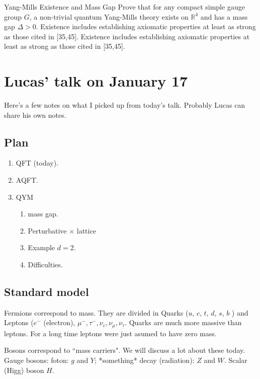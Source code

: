 \begin{thing7}{Yang-Mills Existence and Mass Gap}\leavevmode
 Prove that for any compact simple gauge group \(G\), a non-trivial quantum
 Yang-Mills theory exists on \(\mathbb{R}^4\) and has a mass gap \(\Delta>0\).
 Existence includes establishing axiomatic properties at least as strong as
 those cited in [35,45]. Existence includes establishing axiomatic properties at
 least as strong as those cited in [35,45].
\end{thing7}

\section{Lucas' talk on January 17}

Here's a few notes on what I picked up from today's talk. Probably Lucas can
share his own notes.

\subsection{Plan}

\begin{enumerate}
\item QFT (today).
\item AQFT.
 \item  QYM
\begin{enumerate}
\item mass gap.
\item Perturbative \(\times\) lattice
\item Example \(d=2\).
\item Difficulties.
\end{enumerate}
\end{enumerate}


\subsection{Standard model}

Fermions correspond to mass. They are divided in Quarks ($u$, $c$, $t$, $d$,
$s$, $b$ ) and Leptons (\(e^-\) (electron), \(\mu^-, \tau^-, \nu_e, \nu_\mu,
\nu_\tau\). Quarks are much more massive than leptons. For a long time leptons
were just asumed to have zero mass.

Bosons correspond to ``mass carriers". We will discuss a lot about these today.
Gauge bosons: foton: $g$ and \(Y\); *something* decay (radiation): \(Z\) and
\(W\). Scalar (Higg) boson \(H\).

